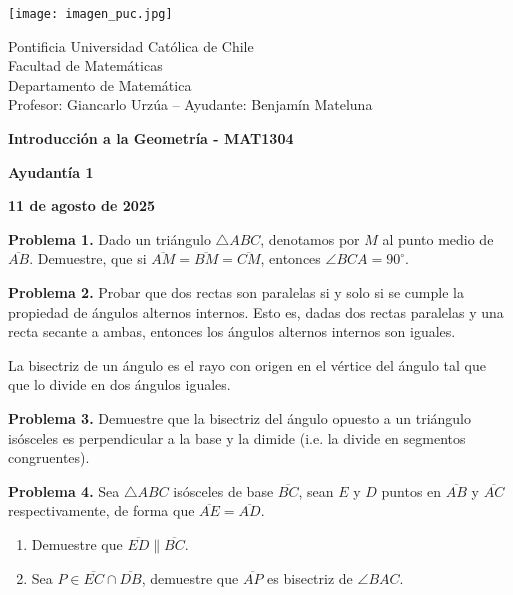 \documentclass{article}
\begin{document}
\begin{minipage}{2.5cm}
    \texttt{[image: imagen\_puc.jpg]}
\end{minipage}
\begin{minipage}{14cm}
    {\sc Pontificia Universidad Católica de Chile\\
    Facultad de Matemáticas\\
    Departamento de Matemática\\
    Profesor: Giancarlo Urzúa -- Ayudante: Benjamín Mateluna}
\end{minipage}
\vspace{1ex}

{\centerline{\bf Introducción a la Geometría - MAT1304}
\centerline{\bf Ayudantía 1}}
\centerline{\bf 11 de agosto de 2025}

\vspace{1cm}
\noindent\textbf{Problema 1.} Dado un triángulo $\triangle ABC$, denotamos por $M$ al punto medio
de $\overline{AB}$. Demuestre, que si $\overline{AM}=\overline{BM}=\overline{CM}$, entonces 
$\angle BCA=90^{\circ}$.

\vspace{5mm}
\noindent\textbf{Problema 2.} Probar que dos rectas son paralelas si y solo si se cumple la 
propiedad de ángulos alternos internos. Esto es, dadas dos rectas paralelas y una recta secante a
ambas, entonces los ángulos alternos internos son iguales.

\vspace{5mm}
\begin{dfn}
    La bisectriz de un ángulo es el rayo con origen en el vértice del ángulo tal que que lo divide 
    en dos ángulos iguales.
\end{dfn}
\vspace{2mm}
\noindent\textbf{Problema 3.} Demuestre que la bisectriz del ángulo opuesto a un triángulo 
isósceles es perpendicular a la base y la dimide (i.e. la divide en segmentos congruentes).

\vspace{5mm}
\noindent\textbf{Problema 4.} Sea $\triangle ABC$ isósceles de base $\overline{BC}$, sean $E$ y 
$D$ puntos en $\overline{AB}$ y $\overline{AC}$ respectivamente, de forma que 
$\overline{AE}=\overline{AD}$.
\begin{enumerate}
    \item Demuestre que $\overline{ED}\parallel\overline{BC}$.
    \item Sea $P\in\overline{EC}\cap\overline{DB}$, demuestre que $\overline{AP}$ es bisectriz de
    $\angle BAC$.
\end{enumerate}
\end{document}
